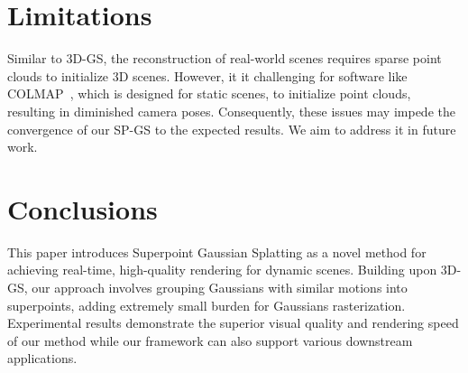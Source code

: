 \section{Limitations}
Similar to 3D-GS, the reconstruction of real-world scenes requires sparse point clouds to initialize 3D scenes. However, it it challenging for software like COLMAP~\cite{colmap}, which is designed for static scenes, to initialize point clouds, resulting in diminished camera poses. Consequently, these issues may impede the convergence of our SP-GS to the expected results. We aim to address it in future work.


\section{Conclusions}
This paper introduces Superpoint Gaussian Splatting as a novel method for achieving real-time, high-quality rendering for dynamic scenes. Building upon 3D-GS, our approach involves grouping Gaussians with similar motions into superpoints, adding extremely small burden for Gaussians rasterization. 
Experimental results demonstrate the superior visual quality and rendering speed of our method while our framework can also support various downstream applications.
